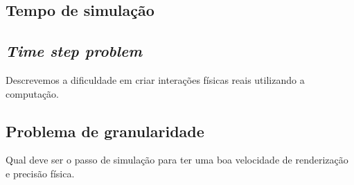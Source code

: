 
\subsection{Tempo de simulação}

\subsection{\textit{Time step problem}}
Descrevemos a dificuldade em criar interações físicas reais utilizando a computação.

\subsection{Problema de granularidade}
Qual deve ser o passo de simulação para ter uma boa velocidade de renderização e precisão física.
